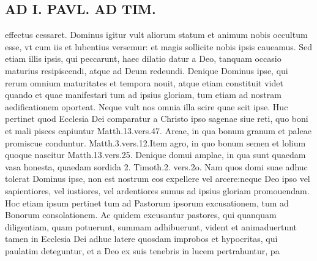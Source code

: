 \documentclass{article}
\begin{document}
\begin{pages}
\section*{AD I. PAVL. AD TIM. }
\marginpar{[ p.386 ]}\pstart effectus cessaret. Dominus igitur vult aliorum statum et animum nobis occultum esse, vt cum iis et lubentius versemur: et magis sollicite nobis ipsis caueamus. Sed etiam illis ipsis, qui peccarunt, haec dilatio datur a Deo, tanquam occasio maturius resipiscendi, atque ad Deum redeundi. Denique Dominus ipse, qui rerum omnium maturitates et tempora nouit, atque etiam constituit videt quando et quae manifestari tum ad ipsius gloriam, tum etiam ad nostram aedificationem oporteat. Neque vult nos omnia illa scire quae scit ipse. Huc pertinet quod Ecclesia Dei comparatur a Christo ipso sagenae siue reti, quo boni et mali pisces capiuntur Matth.13.vers.47. Areae, in qua bonum granum et paleae promiscue conduntur. Matth.3.vers.12.Item agro, in quo bonum semen et lolium quoque nascitur Matth.13.vers.25. Denique domui amplae, in qua sunt quaedam vasa honesta, quaedam sordida 2. Timoth.2. vers.2o. Nam quos domi suae adhuc tolerat Dominus ipse, non est nostrum eos expellere vel arcere:neque Deo ipso vel sapientiores, vel iustiores, vel ardentiores sumus ad ipsius gloriam promouendam. Hoc etiam ipsum pertinet tum ad Pastorum ipsorum excusationem, tum ad Bonorum consolationem. Ac quidem excusantur pastores, qui quanquam diligentiam, quam potuerunt, summam adhibuerunt, vident et animaduertunt tamen in Ecclesia Dei adhuc latere quosdam improbos et hypocritas, qui paulatim deteguntur, et a Deo ex suis tenebris in lucem pertrahuntur, pa\pend

\end{pages}
\end{document}

